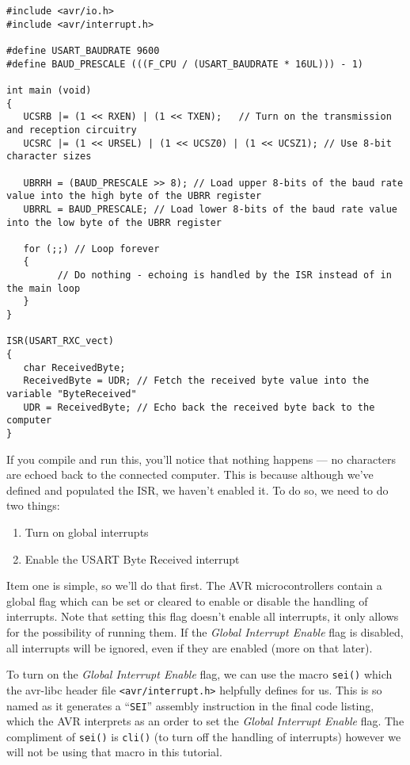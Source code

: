 \documentclass[a4paper,oneside,notitlepage]{book}
\begin{document}
\begin{center}
\begin{lstlisting}
#include <avr/io.h>
#include <avr/interrupt.h>

#define USART_BAUDRATE 9600
#define BAUD_PRESCALE (((F_CPU / (USART_BAUDRATE * 16UL))) - 1)

int main (void)
{
   UCSRB |= (1 << RXEN) | (1 << TXEN);   // Turn on the transmission and reception circuitry
   UCSRC |= (1 << URSEL) | (1 << UCSZ0) | (1 << UCSZ1); // Use 8-bit character sizes

   UBRRH = (BAUD_PRESCALE >> 8); // Load upper 8-bits of the baud rate value into the high byte of the UBRR register
   UBRRL = BAUD_PRESCALE; // Load lower 8-bits of the baud rate value into the low byte of the UBRR register

   for (;;) // Loop forever
   {
         // Do nothing - echoing is handled by the ISR instead of in the main loop
   }   
}

ISR(USART_RXC_vect)
{
   char ReceivedByte;
   ReceivedByte = UDR; // Fetch the received byte value into the variable "ByteReceived"
   UDR = ReceivedByte; // Echo back the received byte back to the computer
}
\end{lstlisting}
\end{center}

If you compile and run this, you'll notice that nothing happens --- no characters are echoed back to the connected computer. This is because although we've defined and populated the ISR, we haven't enabled it. To do so, we need to do two things:

\begin{enumerate}
	\item Turn on global interrupts
    \item Enable the USART Byte Received interrupt
\end{enumerate}

Item one is simple, so we'll do that first. The AVR microcontrollers contain a global flag which can be set or cleared to enable or disable the handling of interrupts. Note that setting this flag doesn't enable all interrupts, it only allows for the possibility of running them. If the \emph{Global Interrupt Enable} flag is disabled, all interrupts will be ignored, even if they are enabled (more on that later).

To turn on the \emph{Global Interrupt Enable} flag, we can use the macro \texttt{sei()} which the avr-libc header file \texttt{<avr/interrupt.h>} helpfully defines for us. This is so named as it generates a ``\texttt{SEI}'' assembly instruction in the final code listing, which the AVR interprets as an order to set the \emph{Global Interrupt Enable} flag. The compliment of \texttt{sei()} is \texttt{cli()} (to turn off the handling of interrupts) however we will not be using that macro in this tutorial.
\end{document}
